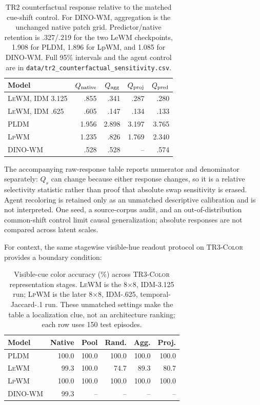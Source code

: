 \documentclass{article}
\newcommand{\trthree}{\textsc{TR3-Color}}
\newcommand{\lewm}{\textsc{LeWM}}
\newcommand{\pldm}{\textsc{PLDM}}
\newcommand{\lpwm}{\textsc{LpWM}}
\newcommand{\dinowm}{\textsc{DINO-WM}}
\begin{document}
\begin{table}[h]
\centering
\small
\setlength{\tabcolsep}{2.5pt}
\begin{tabular}{@{}lrrrr@{}}
\toprule
Model & $Q_{\rm native}$ & $Q_{\rm agg}$ & $Q_{\rm proj}$ & $Q_{\rm pred}$ \\
\midrule
\lewm{}, IDM 3.125 & .855 & .341 & .287 & .280 \\
\lewm{}, IDM .625 & .605 & .147 & .134 & .133 \\
\pldm{} & 1.956 & 2.898 & 3.197 & 3.765 \\
\lpwm{} & 1.235 & .826 & 1.769 & 2.340 \\
\dinowm{} & .528 & .528 & -- & .574 \\
\bottomrule
\end{tabular}
\caption{TR2 counterfactual response relative to the matched cue-shift control.
For DINO-WM, aggregation is the unchanged native patch grid. Predictor/native
retention is .327/.219 for the two LeWM checkpoints, 1.908 for PLDM, 1.896 for
LpWM, and 1.085 for DINO-WM. Full 95\% intervals and the agent control are in
\texttt{data/tr2\_counterfactual\_sensitivity.csv}.}
\label{tab:counterfactual}
\end{table}

The accompanying raw-response table reports numerator and denominator
separately: $Q_s$ can change because either response changes, so it is a
relative selectivity statistic rather than proof that absolute swap
sensitivity is erased.  Agent recoloring is retained only as an unmatched
descriptive calibration and is not interpreted.  One
seed, a source-corpus audit, and an out-of-distribution common-shift control
limit causal generalization; absolute responses are not compared across
latent scales.

For context, the same stagewise visible-hue readout protocol on \trthree{}
provides a boundary condition:

\begin{table}[h]
\centering
\small
\setlength{\tabcolsep}{2.5pt}
\begin{tabular}{@{}lrrrrr@{}}
\toprule
Model & Native & Pool & Rand. & Agg. & Proj. \\
\midrule
\pldm{} & 100.0 & 100.0 & 100.0 & 100.0 & 100.0 \\
\lewm{} & 99.3 & 100.0 & 74.7 & 89.3 & 80.7 \\
\lpwm{} & 100.0 & 100.0 & 100.0 & 100.0 & 100.0 \\
\dinowm{} & 99.3 & -- & -- & -- & -- \\
\bottomrule
\end{tabular}
\caption{Visible-cue color accuracy (\%) across \trthree{}
representation
stages.  \lewm{} is the 8$\times$8, IDM-3.125 run; \lpwm{} is the later
8$\times$8, IDM-.625, temporal-Jaccard-.1 run.  These unmatched settings make
the table a localization clue, not an architecture ranking; each row uses 150
test episodes.}
\label{tab:stagewise-tr3}
\end{table}
\end{document}

